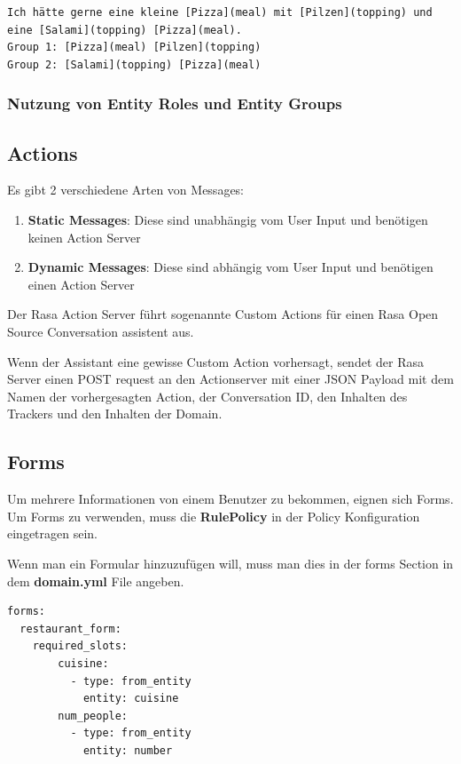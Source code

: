 \begin{lstlisting}[label={lst: Entity Groups Example 2}]
Ich hätte gerne eine kleine [Pizza](meal) mit [Pilzen](topping) und eine [Salami](topping) [Pizza](meal).
Group 1: [Pizza](meal) [Pilzen](topping)
Group 2: [Salami](topping) [Pizza](meal)
\end{lstlisting}


\subsubsection{Nutzung von Entity Roles und Entity Groups}

\subsection{Actions}

Es gibt 2 verschiedene Arten von Messages:

\begin{enumerate}
  \item \textbf{Static Messages}: Diese sind unabhängig vom User Input und benötigen keinen Action Server\cite{actionsVid}
  \item \textbf{Dynamic Messages}: Diese sind abhängig vom User Input und benötigen einen Action Server\cite{actionsVid}
\end{enumerate}

Der Rasa Action Server führt sogenannte Custom Actions für einen Rasa Open Source Conversation assistent aus.

Wenn der Assistant eine gewisse Custom Action vorhersagt, sendet der Rasa Server einen POST request an den Actionserver mit einer JSON Payload mit dem Namen der vorhergesagten Action, der Conversation ID, den Inhalten des Trackers und den Inhalten der Domain.\cite{actions}

\subsection{Forms}

Um mehrere Informationen von einem Benutzer zu bekommen, eignen sich Forms.
Um Forms zu verwenden, muss die \textbf{RulePolicy} in der Policy Konfiguration eingetragen sein.\cite{forms}

Wenn man ein Formular hinzuzufügen will, muss man dies in der forms Section in dem \textbf{domain.yml} File angeben.

\begin{lstlisting}[label={lst: Forms Example}]
forms:
  restaurant_form:
    required_slots:
        cuisine:
          - type: from_entity
            entity: cuisine
        num_people:
          - type: from_entity
            entity: number
\end{lstlisting}


